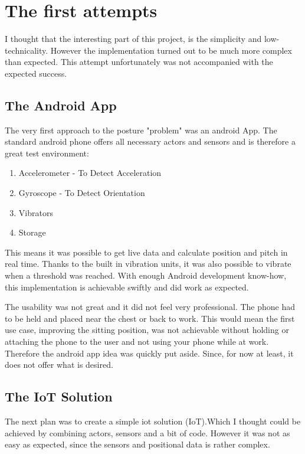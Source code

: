 \chapter*{The first attempts}
\label{chap:The first attempts}
\renewcommand{\thesection}{\arabic{section}}
\setcounter{section}{0}

I thought that the interesting part of this project, is the simplicity and low-technicality. However the implementation turned out to be much more complex than expected. This attempt unfortunately was not accompanied with the expected success.

\section{The Android App}

The very first approach to the posture "problem" was an android App. The standard android phone offers all necessary actors and sensors and is therefore a great test environment: 
\begin{enumerate}
    \item \gls{Accelerometer} - To Detect Acceleration
    \item \gls{Gyroscope} - To Detect Orientation
    \item Vibrators
    \item Storage
\end{enumerate}

This means it was possible to get live data and calculate position and pitch in real time. Thanks to the built in vibration units, it was also possible to vibrate when a threshold was reached. With enough Android development know-how, this implementation is achievable swiftly and did work as expected.

The usability was not great and it did not feel very professional. The phone had to be held and placed near the chest or back to work. This would mean the first use case, improving the sitting position, was not achievable without holding or attaching the phone to the user and not using your phone while at work. Therefore the android app idea was quickly put aside. Since, for now at least, it does not offer what is desired.

\newpage
\section{The IoT Solution}

The next plan was to create a simple \acrshort{iot} solution (\gls{IoT}).Which I thought could be achieved by combining actors, sensors  and a bit of code. However it was not as easy as expected, since the sensors and positional data is rather complex. 

